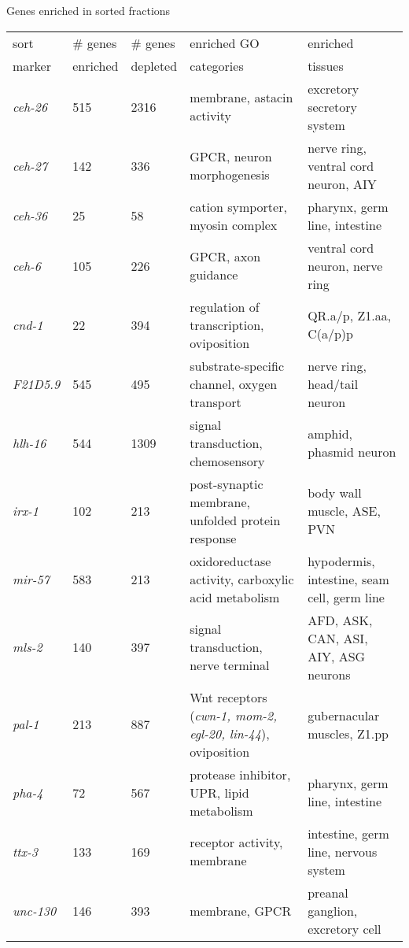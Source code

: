 \documentclass[serif,9pt]{beamer}
\begin{document}
\begin{frame}{Genes enriched in sorted fractions}

\begin{table}\tiny
\begin{tabular}{lll p{1.2in} p{1.2in} }
sort & \# genes & \# genes & enriched GO & enriched \\
marker & enriched & depleted & categories & tissues \\
\hline
{\em ceh-26} & 515 & 2316 & membrane, astacin activity & excretory secretory system \\
{\em ceh-27} & 142 & 336 & GPCR, neuron morphogenesis & nerve ring, ventral cord neuron, AIY \\
{\em ceh-36} & 25 & 58 & cation symporter, myosin complex & pharynx, germ line, intestine \\
{\em ceh-6} & 105 & 226 & GPCR, axon guidance & ventral cord neuron, nerve ring \\
{\em cnd-1} & 22 & 394 & regulation of transcription, oviposition & QR.a/p, Z1.aa, C(a/p)p \\
{\em F21D5.9} & 545 & 495 & substrate-specific channel, oxygen transport & nerve ring, head/tail neuron \\
{\em hlh-16} & 544 & 1309 & signal transduction, chemosensory & amphid, phasmid neuron \\
{\em irx-1} & 102 & 213 & post-synaptic membrane, unfolded protein response & body wall muscle, ASE, PVN \\
{\em mir-57} & 583 & 213 & oxidoreductase activity, carboxylic acid metabolism & hypodermis, intestine, seam cell, germ line \\
{\em mls-2} & 140 & 397 & signal transduction, nerve terminal & AFD, ASK, CAN, ASI, AIY, ASG neurons \\
{\em pal-1} & 213 & 887 & Wnt receptors ({\em cwn-1, mom-2, egl-20, lin-44}), oviposition & gubernacular muscles, Z1.pp      \\
{\em pha-4} & 72 & 567 & protease inhibitor, UPR, lipid metabolism & pharynx, germ line, intestine \\
{\em ttx-3} & 133 & 169 & receptor activity, membrane & intestine, germ line, nervous system \\
{\em unc-130} & 146 & 393 & membrane, GPCR & preanal ganglion, excretory cell \\
\end{tabular}
\end{table}

\end{frame}
\end{document}
